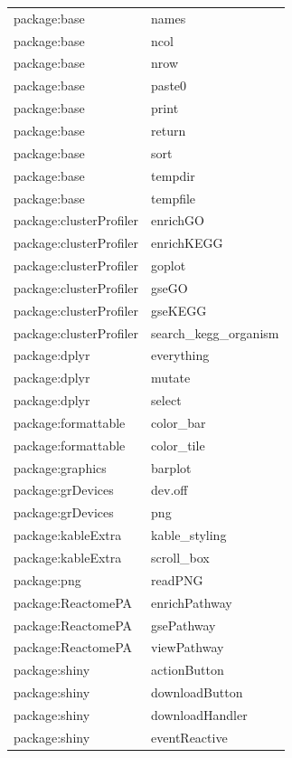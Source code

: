 \documentclass[]{article}
\begin{document}
\begin{longtable}{ll}
\rowcolor{gray!6} package:base & names\\
package:base & ncol\\
\rowcolor{gray!6} package:base & nrow\\
package:base & paste0\\
\rowcolor{gray!6} package:base & print\\
package:base & return\\
\rowcolor{gray!6} package:base & sort\\
package:base & tempdir\\
\rowcolor{gray!6} package:base & tempfile\\
package:clusterProfiler & enrichGO\\
\rowcolor{gray!6} package:clusterProfiler & enrichKEGG\\
package:clusterProfiler & goplot\\
\rowcolor{gray!6} package:clusterProfiler & gseGO\\
package:clusterProfiler & gseKEGG\\
\rowcolor{gray!6} package:clusterProfiler & search\_kegg\_organism\\
package:dplyr & everything\\
\rowcolor{gray!6} package:dplyr & mutate\\
package:dplyr & select\\
\rowcolor{gray!6} package:formattable & color\_bar\\
package:formattable & color\_tile\\
\rowcolor{gray!6} package:graphics & barplot\\
package:grDevices & dev.off\\
\rowcolor{gray!6} package:grDevices & png\\
package:kableExtra & kable\_styling\\
\rowcolor{gray!6} package:kableExtra & scroll\_box\\
package:png & readPNG\\
\rowcolor{gray!6} package:ReactomePA & enrichPathway\\
package:ReactomePA & gsePathway\\
\rowcolor{gray!6} package:ReactomePA & viewPathway\\
package:shiny & actionButton\\
\rowcolor{gray!6} package:shiny & downloadButton\\
package:shiny & downloadHandler\\
\rowcolor{gray!6} package:shiny & eventReactive\\

\end{longtable}
\end{document}
